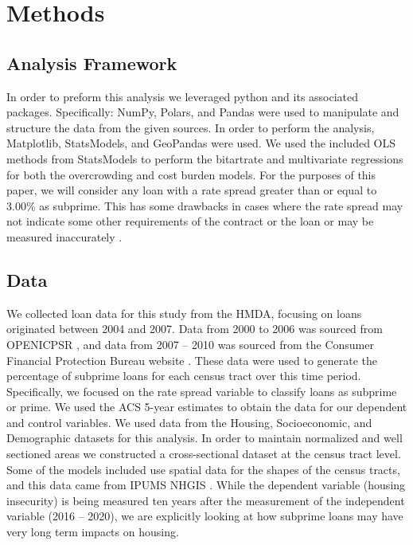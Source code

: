 \documentclass{article}
\begin{document}
\section{Methods}

\subsection{Analysis Framework}

In order to preform this analysis we leveraged python and its associated packages. Specifically: NumPy, Polars, and Pandas were used to manipulate and structure the data from the given sources. In order to perform the analysis, Matplotlib, StatsModels, and GeoPandas were used. We used the included OLS methods from StatsModels to perform the bitartrate and multivariate regressions for both the overcrowding and cost burden models. For the purposes of this paper, we will consider any loan with a rate spread greater than or equal to 3.00\% as subprime. This has some drawbacks in cases where the rate spread may not indicate some other requirements of the contract or the loan or may be measured inaccurately \cite{mayer2008subprime}.

\subsection{Data}

We collected loan data for this study from the HMDA, focusing on loans originated between 2004 and 2007. Data from 2000 to 2006 was sourced from OPENICPSR \cite{openicpsr_hmda_2000_2006}, and data from 2007 -- 2010 was sourced from the Consumer Financial Protection Bureau website \cite{cfpb_hmda_2007_2010}. These data were used to generate the percentage of subprime loans for each census tract over this time period. Specifically, we focused on the rate spread variable to classify loans as subprime or prime. We used the ACS 5-year estimates \cite{census_acs_2016_2020} to obtain the data for our dependent and control variables. We used data from the Housing, Socioeconomic, and Demographic datasets for this analysis. In order to maintain normalized and well sectioned areas we constructed a cross-sectional dataset at the census tract level. Some of the models included use spatial data for the shapes of the census tracts, and this data came from IPUMS NHGIS \cite{ipums_nhgis}. While the dependent variable (housing insecurity) is being measured ten years after the measurement of the independent variable (2016 -- 2020), we are explicitly looking at how subprime loans may have very long term impacts on housing. 
\end{document}

